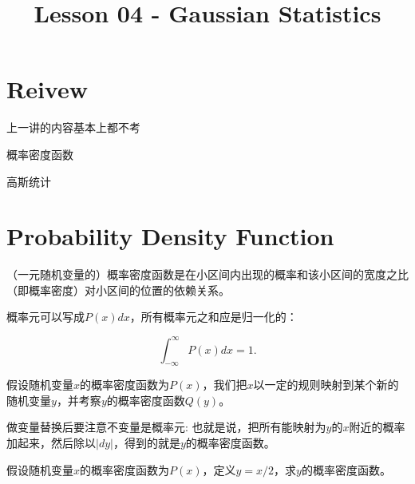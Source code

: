 \documentclass[CJK]{beamer}
\title{Lesson 04 - Gaussian Statistics}
\author{}
\date{}
\begin{document}

\section{Reivew}

\begin{frame}
\bch
上一讲的内容基本上都不考
\ech
\end{frame}


\begin{frame}
\bch
\bitem
\item{概率密度函数}
\item{高斯统计}
\eitem
\ech
\end{frame}

\section{Probability Density Function}


\begin{frame}
\bch
（一元随机变量的）概率密度函数是在小区间内出现的概率和该小区间的宽度之比（即概率密度）对小区间的位置的依赖关系。

概率元可以写成$P(x) dx$，所有概率元之和应是归一化的：

$$\int_{-\infty}^\infty P(x) dx  = 1.$$
\ech
\end{frame}

\begin{frame}
\bch
假设随机变量$x$的概率密度函数为$P(x)$，我们把$x$以一定的规则映射到某个新的随机变量$y$，并考察$y$的概率密度函数$Q(y)$。

\skipline

做变量替换后要注意不变量是概率元:
也就是说，把所有能映射为$y$的$x$附近的概率加起来，然后除以$|dy|$，得到的就是$y$的概率密度函数。
\ech
\end{frame}


\begin{frame}
\bch


假设随机变量$x$的概率密度函数为$P(x)$，定义$y=x/2$，求$y$的概率密度函数。
\ech
\end{frame}
\end{document}
